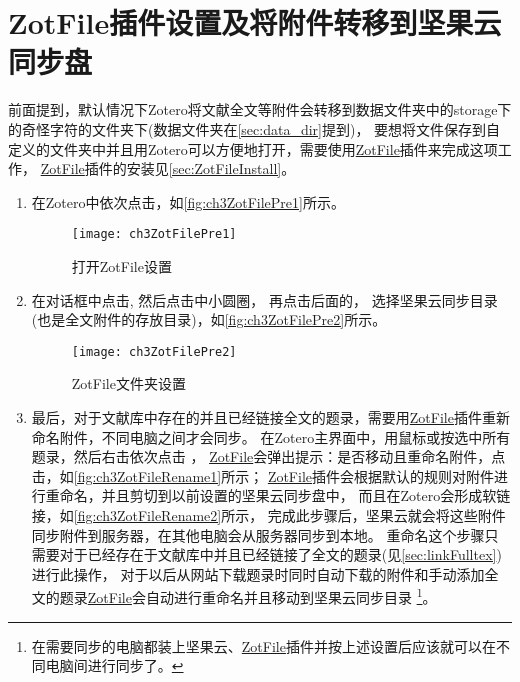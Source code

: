 \documentclass[cn,11pt,chinese]{elegantbook}
\begin{document}
	\section{ZotFile插件设置及将附件转移到坚果云同步盘}\label{sec:zotFilePre}
		前面提到，默认情况下Zotero将文献全文等附件会转移到数据文件夹中的storage下
		的奇怪字符的文件夹下(数据文件夹在\cref{sec:data_dir}提到)，
		要想将文件保存到自定义的文件夹中并且用Zotero可以方便地打开，需要使用\href{http://zotfile.com/}{ZotFile}插件来完成这项工作，
		\href{http://zotfile.com/}{ZotFile}插件的安装见\cref{sec:ZotFileInstall}。
		\begin{enumerate}
			\item 在Zotero中依次点击，如\autoref{fig:ch3ZotFilePre1}所示。
			\begin{figure}[t]
				\centering
				\texttt{[image: ch3ZotFilePre1]}
				\caption{打开ZotFile设置}
				\label{fig:ch3ZotFilePre1}
			\end{figure}
			\item 在对话框中点击,
			然后点击中小圆圈，
			再点击后面的，
			选择坚果云同步目录(也是全文附件的存放目录)，如\autoref{fig:ch3ZotFilePre2}所示。
			\begin{figure}[htbp]
				\centering
				\texttt{[image: ch3ZotFilePre2]}
				\caption{ZotFile文件夹设置}
				\label{fig:ch3ZotFilePre2}
			\end{figure}
			\item 最后，对于文献库中存在的并且已经链接全文的题录，需要用\href{http://zotfile.com/}{ZotFile}插件重新命名附件，不同电脑之间才会同步。
			在Zotero主界面中，用鼠标或按选中所有题录，然后右击依次点击
			，
			\href{http://zotfile.com/}{ZotFile}会弹出提示：是否移动且重命名附件，点击，如\autoref{fig:ch3ZotFileRename1}所示；
			\href{http://zotfile.com/}{ZotFile}插件会根据默认的规则对附件进行重命名，并且剪切到以前设置的坚果云同步盘中，
			而且在Zotero会形成软链接，如\autoref{fig:ch3ZotFileRename2}所示，
			完成此步骤后，坚果云就会将这些附件同步附件到服务器，在其他电脑会从服务器同步到本地。
			重命名这个步骤只需要对于已经存在于文献库中并且已经链接了全文的题录(见\cref{sec:linkFulltex})进行此操作，
			对于以后从网站下载题录时同时自动下载的附件和手动添加全文的题录\href{http://zotfile.com/}{ZotFile}会自动进行重命名并且移动到坚果云同步目录
			\footnote{在需要同步的电脑都装上坚果云、\href{http://zotfile.com/}{ZotFile}插件并按上述设置后应该就可以在不同电脑间进行同步了。}。
	



\end{enumerate}
\end{document}
